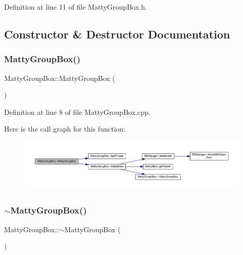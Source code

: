 Definition at line 11 of file Matty\+Group\+Box.\+h.



\subsection{Constructor \& Destructor Documentation}
\hypertarget{classMattyGroupBox_aa44b29a1b8b8f5129f52c2972c24aecd}{}\label{classMattyGroupBox_aa44b29a1b8b8f5129f52c2972c24aecd} 
\subsubsection{\texorpdfstring{Matty\+Group\+Box()}{MattyGroupBox()}}
{\footnotesize\ttfamily Matty\+Group\+Box\+::\+Matty\+Group\+Box (\begin{DoxyParamCaption}{ }\end{DoxyParamCaption})}



Definition at line 8 of file Matty\+Group\+Box.\+cpp.

Here is the call graph for this function\+:
\nopagebreak
\begin{figure}[H]
\begin{center}
\leavevmode
\includegraphics[width=350pt]{classMattyGroupBox_aa44b29a1b8b8f5129f52c2972c24aecd_cgraph}
\end{center}
\end{figure}
\hypertarget{classMattyGroupBox_acf5f5023cf210a83e9846a35b149dd70}{}\label{classMattyGroupBox_acf5f5023cf210a83e9846a35b149dd70} 
\subsubsection{\texorpdfstring{$\sim$\+Matty\+Group\+Box()}{~MattyGroupBox()}}
{\footnotesize\ttfamily Matty\+Group\+Box\+::$\sim$\+Matty\+Group\+Box (\begin{DoxyParamCaption}{ }\end{DoxyParamCaption})}



